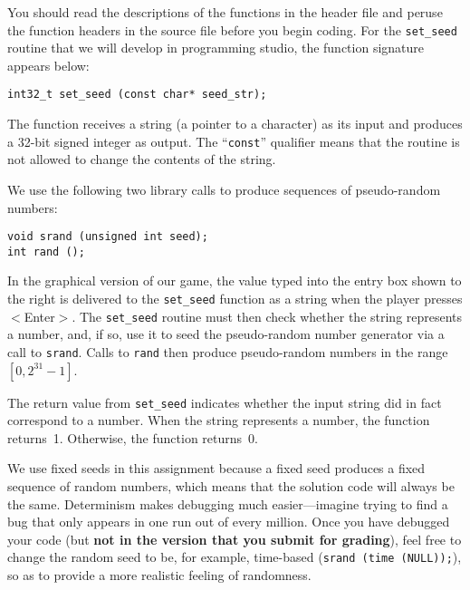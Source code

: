 You should read the descriptions of the functions in the header
file and peruse the function headers in the source file before you begin
coding.
%
For the {\tt set\_seed} routine that we will develop in programming studio,
the function signature appears below:

\protect{\mbox{\hspace{.25in}}}%
{\tt int32\_t set\_seed (const char* seed\_str);}

The function receives a string (a pointer to a character) as its input
and produces a \mbox{32-bit} signed integer as output.  The ``{\tt const}''
qualifier means that the routine is not allowed to change the contents 
of the string.  

We use the following two library calls to produce sequences of pseudo-random numbers:

\protect{\mbox{\hspace{.25in}}}%
{\tt void srand (unsigned int seed);}\\
\protect{\mbox{\hspace{.25in}}}%
{\tt int rand ();}

\begin{minipage}{4.8in}
In the graphical version of our game,
the value typed into the entry box shown to the right is delivered to
the {\tt set\_seed} function as a string when the player presses $<$Enter$>$.
The {\tt set\_seed} routine
must then check whether the string represents a number, and, if so,
use it to seed the pseudo-random number generator via a call 
to {\tt srand}.  Calls to {\tt rand} then produce pseudo-random numbers
in the range~$[0,2^{31}-1]$.
\end{minipage}\hspace{.25in}%
\begin{minipage}{1.45in}
\end{minipage}

The return value from {\tt set\_seed} indicates whether the input string
did in fact correspond to a number.  When the string represents
a number, the function returns~1.
Otherwise, the function returns~0.

We use fixed seeds in
this assignment because a fixed seed produces a fixed sequence of 
random numbers, which means that the solution code will always be the
same.  Determinism makes debugging much easier---imagine trying to find
a bug that only appears in one run out of every million.  Once you have
debugged your code (but {\bf not in the version that you submit for grading}),
feel free to change the random seed to be, for example, time-based
({\tt srand (time (NULL));}), 
so as to provide a more realistic feeling of randomness.

